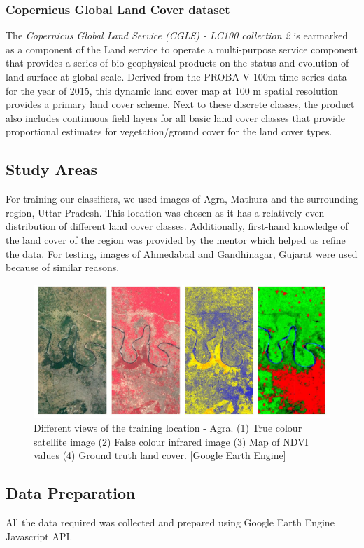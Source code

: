 \documentclass[12pt, a4paper]{report}
\begin{document}
\subsubsection{Copernicus Global Land Cover dataset}
The \textit{Copernicus Global Land Service (CGLS) - LC100 collection 2} is earmarked as a component of the Land service to operate a multi-purpose service component that provides a series of bio-geophysical products on the status and evolution of land surface at global scale. Derived from the PROBA-V 100m time series data for the year of 2015, this dynamic land cover map at 100 m spatial resolution provides a primary land cover scheme. Next to these discrete classes, the product also includes continuous field layers for all basic land cover classes that provide proportional estimates for vegetation/ground cover for the land cover types.\cite{geecglc}
\subsection{Study Areas}
For training our classifiers, we used images of Agra, Mathura and the surrounding region, Uttar Pradesh. This location was chosen as it has a relatively even distribution of different land cover classes. Additionally, first-hand knowledge of the land cover of the region was provided by the mentor which helped us refine the data. For testing, images of Ahmedabad and Gandhinagar, Gujarat were used because of similar reasons.
\begin{figure}[h]
\centering
\includegraphics[width=\textwidth]{agra.jpg}
\caption{Different views of the training location - Agra. (1) True colour satellite image (2) False colour infrared image (3) Map of NDVI values (4) Ground truth land cover. [Google Earth Engine]}
\end{figure}
\newpage
\subsection{Data Preparation}
All the data required was collected and prepared using Google Earth Engine Javascript API.
\end{document}
